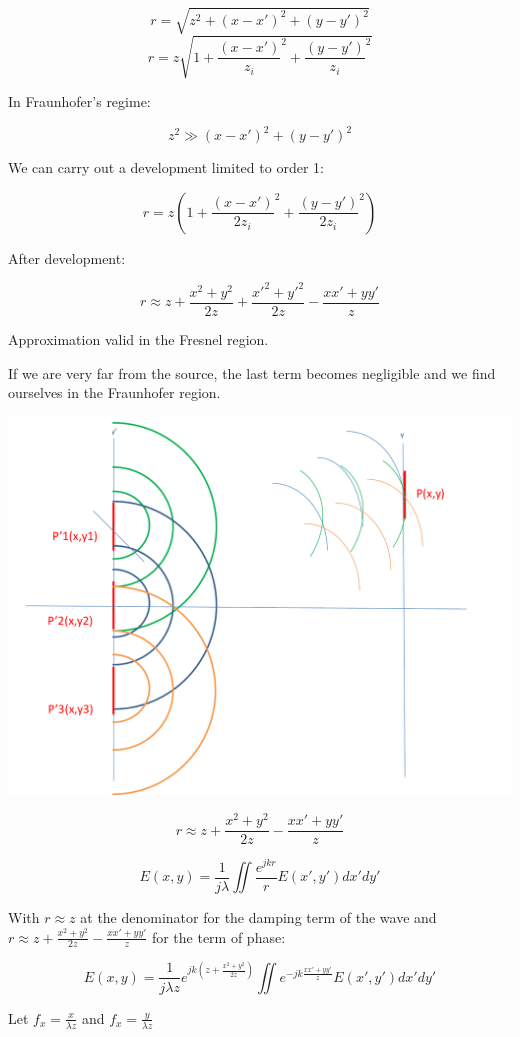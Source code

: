 \documentclass[10pt,a4paper]{article}
\begin{document}
\[r=\sqrt{z^2+(x-x')^2+(y-y')^2}\]
\[r=z\sqrt{1+\frac{(x-x')}{z_i}^2+\frac{(y-y')}{z_i}^2}\]

In Fraunhofer’s regime:

\[z^2\gg(x-x')^2+(y-y')^2\]

We can carry out a development limited to order 1: 

\[r=z\left(1+\frac{(x-x')}{2z_i}^2+\frac{(y-y')}{2z_i}^2\right)\]

After development:

\[r \approx z+\frac{x^2+y^2}{2z}+\frac{x'^2+y'^2}{2z}-\frac{xx'+yy'}{z}\]

Approximation valid in the Fresnel region. 

If we are very far from the source, the last term becomes negligible and we find ourselves in the Fraunhofer region.

\begin{center}
\includegraphics[scale=0.32]{../Ressources/schema-3.png}
\end{center}

\[r \approx z+\frac{x^2+y^2}{2z}-\frac{xx'+yy'}{z}\]

\[E(x,y)=\frac{1}{j\lambda} \iint \frac{e^{jkr}}{r}E(x',y')dx'dy'\]

With $r\approx z$ at the denominator for the damping term of the wave and $r \approx z+\frac{x^2+y^2}{2z}-\frac{xx'+yy'}{z}$ for the term of phase:

\[E(x,y)=\frac{1}{j\lambda z} e^{jk\left(z+\frac{x^2+y^2}{2z}\right)}\iint e^{-jk\frac{xx'+yy'}{z}}E(x',y')dx'dy'\]

Let $f_x=\frac{x}{\lambda z}$ and $f_x=\frac{y}{\lambda z}$
\end{document}
